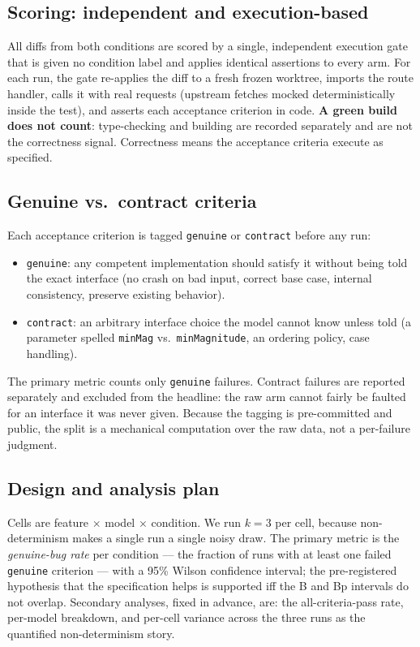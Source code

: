 \documentclass[11pt]{article}
\begin{document}
\subsection{Scoring: independent and execution-based}
All diffs from both conditions are scored by a single, independent execution gate that is given no condition label and applies identical assertions to every arm. For each run, the gate re-applies the diff to a fresh frozen worktree, imports the route handler, calls it with real requests (upstream fetches mocked deterministically inside the test), and asserts each acceptance criterion in code. \textbf{A green build does not count}: type-checking and building are recorded separately and are not the correctness signal. Correctness means the acceptance criteria execute as specified.

\subsection{Genuine vs.\ contract criteria}
\label{sec:genuine}
Each acceptance criterion is tagged \texttt{genuine} or \texttt{contract} before any run:
\begin{itemize}
\item \texttt{genuine}: any competent implementation should satisfy it without being told the exact interface (no crash on bad input, correct base case, internal consistency, preserve existing behavior).
\item \texttt{contract}: an arbitrary interface choice the model cannot know unless told (a parameter spelled \texttt{minMag} vs.\ \texttt{minMagnitude}, an ordering policy, case handling).
\end{itemize}
The primary metric counts only \texttt{genuine} failures. Contract failures are reported separately and excluded from the headline: the raw arm cannot fairly be faulted for an interface it was never given. Because the tagging is pre-committed and public, the split is a mechanical computation over the raw data, not a per-failure judgment.

\subsection{Design and analysis plan}
Cells are feature $\times$ model $\times$ condition. We run $k=3$ per cell, because non-determinism makes a single run a single noisy draw. The primary metric is the \emph{genuine-bug rate} per condition --- the fraction of runs with at least one failed \texttt{genuine} criterion --- with a 95\% Wilson confidence interval; the pre-registered hypothesis that the specification helps is supported iff the B and Bp intervals do not overlap. Secondary analyses, fixed in advance, are: the all-criteria-pass rate, per-model breakdown, and per-cell variance across the three runs as the quantified non-determinism story.
\end{document}
